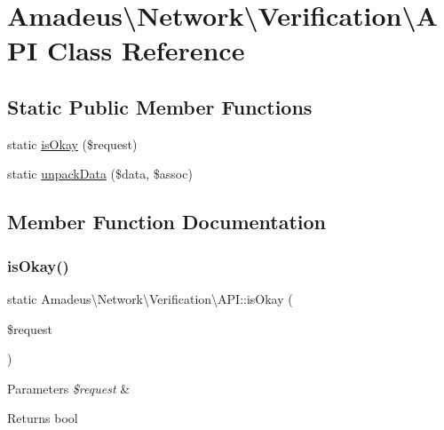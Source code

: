 \hypertarget{classAmadeus_1_1Network_1_1Verification_1_1API}{}\section{Amadeus\textbackslash{}Network\textbackslash{}Verification\textbackslash{}A\+PI Class Reference}
\label{classAmadeus_1_1Network_1_1Verification_1_1API}
\subsection*{Static Public Member Functions}
\begin{DoxyCompactItemize}
\item 
static \hyperlink{classAmadeus_1_1Network_1_1Verification_1_1API_a13d6552fd092ab74d59375a6fc069e03}{is\+Okay} (\$request)
\item 
static \hyperlink{classAmadeus_1_1Network_1_1Verification_1_1API_a6a7ee9e23b92ae9d759d6a4341a70545}{unpack\+Data} (\$data, \$assoc)
\end{DoxyCompactItemize}


\subsection{Member Function Documentation}
\mbox{\label{classAmadeus_1_1Network_1_1Verification_1_1API_a13d6552fd092ab74d59375a6fc069e03}} 
\subsubsection{\texorpdfstring{is\+Okay()}{isOkay()}}
{\footnotesize\ttfamily static Amadeus\textbackslash{}\+Network\textbackslash{}\+Verification\textbackslash{}\+A\+P\+I\+::is\+Okay (\begin{DoxyParamCaption}\item[{}]{\$request }\end{DoxyParamCaption})\hspace{0.3cm}{\ttfamily [static]}}


\begin{DoxyParams}{Parameters}
{\em \$request} & \\
\hline
\end{DoxyParams}
\begin{DoxyReturn}{Returns}
bool 
\end{DoxyReturn}
\mbox{\label{classAmadeus_1_1Network_1_1Verification_1_1API_a6a7ee9e23b92ae9d759d6a4341a70545}} 
